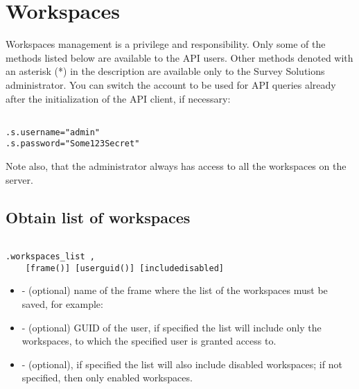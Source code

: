 \section{Workspaces}


Workspaces management is a privilege and responsibility. Only some of the
methods listed below are available to the API users. Other methods denoted
with an asterisk (*) in the description are available only to the Survey
Solutions administrator. You can switch the account to be used for API
queries already after the initialization of the API client, if necessary:

\vskip16pt

\begin{lstlisting}[style=CommandLineStyle, showlines=true]

.s.username="admin"
.s.password="Some123Secret"

\end{lstlisting}

Note also, that the administrator always has access to all the workspaces on
the server.


\subsection{Obtain list of workspaces}

\begin{lstlisting}[style=CommandLineStyle, showlines=true]

.workspaces_list ,
    [frame()] [userguid()] [includedisabled]

\end{lstlisting}

\optsheader
\begin{itemize}

  \item {} - (optional) name of the frame where the list of the
        workspaces must be saved, for example:

  \item {} - (optional) GUID of the user, if specified the
        list will include only the workspaces, to which the specified user is
        granted access to.

  \item {} - (optional), if specified the list will also
        include disabled workspaces; if not specified, then only enabled
        workspaces.

\end{itemize}

